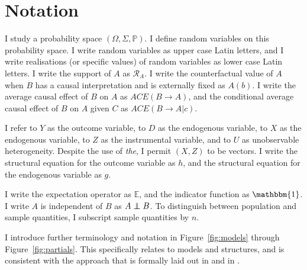 \documentclass[10pt,a4paper,twoside]{article}
\newcommand\independent{\protect\mathpalette{\protect\independenT}{\perp}}
\def\independenT#1#2{\mathrel{\rlap{$#1#2$}\mkern2mu{#1#2}}}
\numberwithin{equation}{section}
\begin{document}
\section*{Notation}
I study a probability space $(\Omega,\Sigma,\mathbb{P})$. I define random variables on this probability space. I write random variables as upper case Latin letters, and I write realisations (or specific values) of random variables as lower case Latin letters. I write the support of $A$ as $\mathcal{R}_A$. I write the counterfactual value of $A$ when $B$ has a causal interpretation and is externally fixed as $A(b)$. I write the average causal effect of $B$ on $A$ as $ACE(B\rightarrow A)$, and the conditional average causal effect of $B$ on $A$ given $C$ as $ACE(B\rightarrow A|c)$.

I refer to $Y$ as the outcome variable, to $D$ as the endogenous variable, to $X$ as the endogenous variable, to $Z$ as the instrumental variable, and to $U$ as unobservable heterogeneity. Despite the use of \emph{the}, I permit $(X,Z)$ to be vectors. I write the structural equation for the outcome variable as $h$, and the structural equation for the endogenous variable as $g$.  

I write the expectation operator as $\mathbb{E}$, and the indicator function as $\mathbbm{1}$. I write $A$ is independent of $B$ as $A\independent B$. To distinguish between population and sample quantities, I subscript sample quantities by $n$. 

I introduce further terminology and notation in Figure~\ref{fig:models} through Figure~\ref{fig:partials}. This specifically relates to models and structures, and is consistent with the approach that is formally laid out in \cite{h50} and in \cite{krE50}. 
\end{document}
